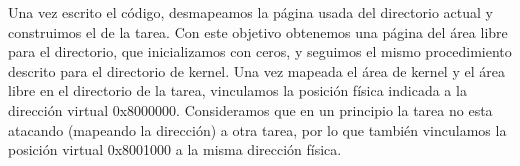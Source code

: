 Una vez escrito el código, desmapeamos la página usada del directorio actual y construimos el de la tarea. 
Con este objetivo obtenemos una página del área libre para el directorio, que inicializamos con ceros, y seguimos el mismo procedimiento descrito para el directorio de kernel.
Una vez mapeada el área de kernel y el área libre en el directorio de la tarea, vinculamos la posición física indicada a la dirección virtual 0x8000000. 
Consideramos que en un principio la tarea no esta atacando (mapeando la dirección) a otra tarea, por lo que también vinculamos la posición virtual 0x8001000 a la misma dirección física.\\


